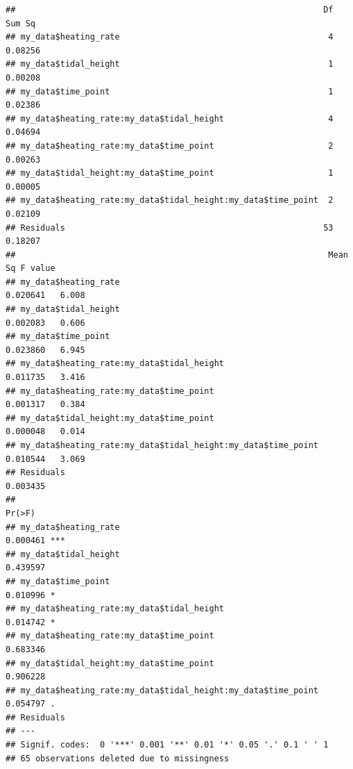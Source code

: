 \documentclass[
]{article}
\newenvironment{Shaded}{\begin{snugshade}}{\end{snugshade}}
\newcommand{\AttributeTok}[1]{\textcolor[rgb]{0.77,0.63,0.00}{#1}}
\newcommand{\FunctionTok}[1]{\textcolor[rgb]{0.00,0.00,0.00}{#1}}
\newcommand{\NormalTok}[1]{#1}
\newcommand{\OtherTok}[1]{\textcolor[rgb]{0.56,0.35,0.01}{#1}}
\newcommand{\SpecialCharTok}[1]{\textcolor[rgb]{0.00,0.00,0.00}{#1}}
\begin{document}
\begin{verbatim}
##                                                              Df  Sum Sq
## my_data$heating_rate                                          4 0.08256
## my_data$tidal_height                                          1 0.00208
## my_data$time_point                                            1 0.02386
## my_data$heating_rate:my_data$tidal_height                     4 0.04694
## my_data$heating_rate:my_data$time_point                       2 0.00263
## my_data$tidal_height:my_data$time_point                       1 0.00005
## my_data$heating_rate:my_data$tidal_height:my_data$time_point  2 0.02109
## Residuals                                                    53 0.18207
##                                                               Mean Sq F value
## my_data$heating_rate                                         0.020641   6.008
## my_data$tidal_height                                         0.002083   0.606
## my_data$time_point                                           0.023860   6.945
## my_data$heating_rate:my_data$tidal_height                    0.011735   3.416
## my_data$heating_rate:my_data$time_point                      0.001317   0.384
## my_data$tidal_height:my_data$time_point                      0.000048   0.014
## my_data$heating_rate:my_data$tidal_height:my_data$time_point 0.010544   3.069
## Residuals                                                    0.003435        
##                                                                Pr(>F)    
## my_data$heating_rate                                         0.000461 ***
## my_data$tidal_height                                         0.439597    
## my_data$time_point                                           0.010996 *  
## my_data$heating_rate:my_data$tidal_height                    0.014742 *  
## my_data$heating_rate:my_data$time_point                      0.683346    
## my_data$tidal_height:my_data$time_point                      0.906228    
## my_data$heating_rate:my_data$tidal_height:my_data$time_point 0.054797 .  
## Residuals                                                                
## ---
## Signif. codes:  0 '***' 0.001 '**' 0.01 '*' 0.05 '.' 0.1 ' ' 1
## 65 observations deleted due to missingness
\end{verbatim}

\begin{Shaded}
\end{Shaded}
\end{document}
